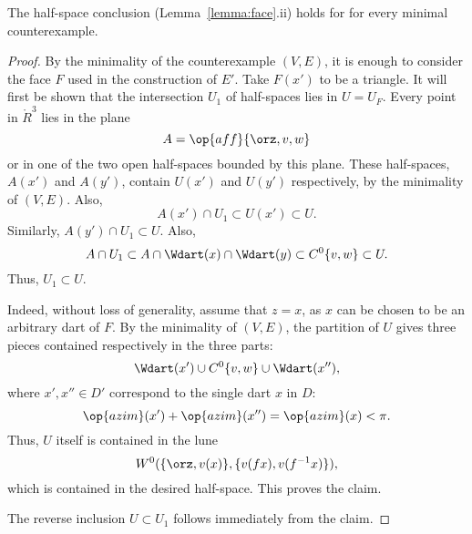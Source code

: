 
\begin{lemma}  The half-space conclusion  (Lemma~\ref{lemma:face}.ii) holds for for every minimal counterexample.
\end{lemma}
%

\begin{proof}
By the minimality of the counterexample $(V,E)$, it is enough to consider
the face $F$ used in the construction of $E'$.  Take $F(x')$ to be a triangle.
It will first be shown that the intersection $U_1$ of half-spaces lies in $U=U_F$.
Every point in $\ring{R}^3$ lies in the plane
$$
A=\op{aff}\{\orz,v,w\}
$$
or in one of the two open half-spaces bounded by this plane.  These half-spaces, $A(x')$ and $A(y')$, 
contain $U(x')$ and $U(y')$ respectively, by the minimality of $(V,E)$.  Also,
$$
A(x')\cap U_1 \subset U(x')\subset U.
$$
Similarly, $A(y')\cap U_1 \subset U$.  Also,
$$
A \cap U_1 \subset A \cap \Wdart(x) \cap \Wdart(y) \subset C^0\{v,w\} \subset U.
$$
Thus,
$U_1\subset U$.

 Indeed, without loss of generality, assume that $z=x$, 
as $x$ can be chosen to be an
arbitrary dart of $F$.  By the minimality of $(V,E)$,  
the partition  of $U$ gives three pieces
contained respectively in the three parts:
$$
\Wdart(x') \cup C^0\{v,w\} \cup \Wdart(x''),
$$
where $x',x''\in D'$ correspond to the single dart $x$ in $D$:
$$
\op{azim}(x') + \op{azim}(x'') = \op{azim}(x) < \pi.
$$
Thus, $U$ itself is contained in the lune
$$
W^0(\{\orz,v(x)\},\{v(f x),v(f^{-1} x)\}),
$$
which is contained in the desired half-space.  This proves the claim.

The reverse inclusion $U\subset U_1$ follows immediately from the claim.
\end{proof}

%

